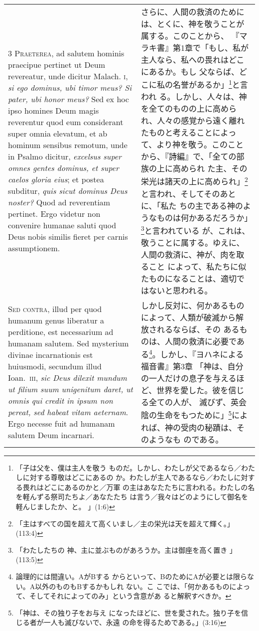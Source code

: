 \documentclass[10pt]{jsarticle} %
\begin{document}
\begin{longtable}{p{21em}p{21em}}
\\

{\scshape 3 Praeterea}, ad salutem hominis praecipue pertinet ut Deum
 revereatur, unde dicitur Malach. {\scshape i}, {\itshape si ego dominus, ubi timor meus? Si
 pater, ubi honor meus?} Sed ex hoc ipso homines Deum magis reverentur
 quod eum considerant super omnia elevatum, et ab hominum sensibus
 remotum, unde in Psalmo dicitur, {\itshape excelsus super omnes gentes dominus,
 et super caelos gloria eius}; et postea subditur,  {\itshape quis sicut dominus
 Deus noster?} Quod ad reverentiam pertinet. Ergo videtur non convenire
 humanae saluti quod Deus nobis similis fieret per carnis assumptionem.

&

さらに、人間の救済のためには、とくに、神を敬うことが属する。このことから、
 『マラキ書』第1章で「もし、私が主人なら、私への畏れはどこにあるか。もし
 父ならば、どこに私の名誉があるか」\footnote{「子は父を、僕は主人を敬う
 ものだ。しかし、わたしが父であるなら／わたしに対する尊敬はどこにあるの
 か。わたしが主人であるなら／わたしに対する畏れはどこにあるのかと／万軍
 の主はあなたたちに言われる。わたしの名を軽んずる祭司たちよ／あなたたち
 は言う／我々はどのようにして御名を軽んじましたか、と。 」(1:6)}と言われ
 る。しかし、人々は、神を全てのものの上に高められ、人々の感覚から遠く離れたものと考えることによっ
 て、より神を敬う。このことから、『詩編』で、「全ての部族の上に高められ
 た主、その栄光は諸天の上に高められ」\footnote{「主はすべての国を超えて高くいまし／主の栄光は天を超えて輝く。」(113:4)}と言われ、そしてそのあとに、「私た
 ちの主である神のようなものは何かあるだろうか」\footnote{「わたしたちの
 神、主に並ぶものがあろうか。主は御座を高く置き 」(113:5)}と言われている
 が、これは、敬うことに属する。ゆえに、人間の救済に、神が、肉を取ること
 によって、私たちに似たものになることは、適切ではないと思われる。


\\

{\scshape Sed contra}, illud per quod humanum genus liberatur a
 perditione, est necessarium ad humanam salutem. Sed mysterium divinae
 incarnationis est huiusmodi, secundum illud Ioan.~{\scshape iii}, {\itshape sic Deus dilexit
 mundum ut filium suum unigenitum daret, ut omnis qui credit in ipsum
 non pereat, sed habeat vitam aeternam}. Ergo necesse fuit ad humanam
 salutem Deum incarnari.

&

しかし反対に、何かあるものによって、人類が破滅から解放されるならば、その
 あるものは、人間の救済に必要である\footnote{論理的には間違い。AがBする
 からといって、BのためにAが必要とは限らない。A以外のものもBするかもしれ
 ない。こ
 こでは、「何かあるものによって、そしてそれによってのみ」という含意があ
 ると解釈すべきか。}。しかし、『ヨハネによる福音書』第3章
 「神は、自分の一人だけの息子を与えるほど、世界を愛した。彼を信じる全ての人が、
 滅びず、英会陰の生命をもつために」\footnote{「神は、その独り子をお与え
 になったほどに、世を愛された。独り子を信じる者が一人も滅びないで、永遠
 の命を得るためである。」(3:16)}によれば、神の受肉の秘蹟は、そのようなも
 のである。


\end{longtable}
\end{document}
